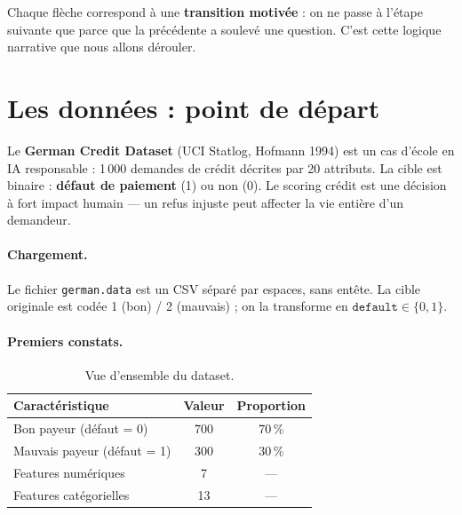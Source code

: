 \documentclass[11pt, a4paper]{article}
\begin{document}
Chaque fl\`{e}che correspond \`{a} une \textbf{transition motiv\'{e}e} : on ne passe \`{a} l'\'{e}tape suivante que parce que la pr\'{e}c\'{e}dente a soulev\'{e} une question. C'est cette logique narrative que nous allons d\'{e}rouler.

\section{Les donn\'{e}es : point de d\'{e}part}
\label{sec:data}

\begin{questionbox}
Le \textbf{German Credit Dataset} (UCI Statlog, Hofmann 1994) est un cas d'\'{e}cole en IA responsable : 1\,000 demandes de cr\'{e}dit d\'{e}crites par 20 attributs. La cible est binaire : \textbf{d\'{e}faut de paiement} (1) ou non (0). Le scoring cr\'{e}dit est une d\'{e}cision \`{a} fort impact humain --- un refus injuste peut affecter la vie enti\`{e}re d'un demandeur.
\end{questionbox}

\paragraph{Chargement.} Le fichier \texttt{german.data} est un CSV s\'{e}par\'{e} par espaces, sans ent\^{e}te. La cible originale est cod\'{e}e 1 (bon) / 2 (mauvais) ; on la transforme en $\texttt{default} \in \{0, 1\}$.

\paragraph{Premiers constats.}

\begin{table}[H]
\centering
\begin{tabular}{lcc}
\toprule
\textbf{Caract\'{e}ristique} & \textbf{Valeur} & \textbf{Proportion} \\
\midrule
Bon payeur (d\'{e}faut = 0) & 700 & 70\,\% \\
Mauvais payeur (d\'{e}faut = 1) & 300 & 30\,\% \\
\midrule
Features num\'{e}riques & 7 & --- \\
Features cat\'{e}gorielles & 13 & --- \\
\bottomrule
\end{tabular}
\caption{Vue d'ensemble du dataset.}
\end{table}
\end{document}
